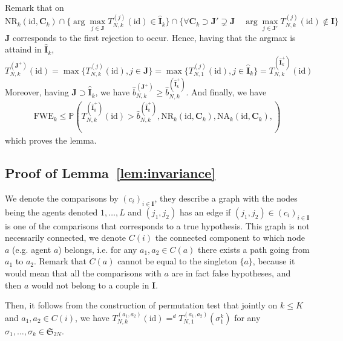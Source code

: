 \documentclass{article}
\theoremstyle{plain}
\theoremstyle{remark}
\renewcommand{\P}{\mathbb{P}}
\renewcommand{\S}{\mathfrak{S}}
\newcommand{\1}{\mathbbm{1}}
\newcommand{\id}{\mathrm{id}}
\numberwithin{equation}{section}
\begin{document}
Remark that on $$\mathrm{NR}_k(\id,\textbf{C}_k) \cap \{\arg\max_{j \in \textbf{J}}T_{N,k}^{(j)}(\id) \in \widehat{\textbf{I}}_k\}\cap\{ \forall \textbf{C}_k \supset \textbf{J}'\supsetneq\textbf{J} \quad  \arg\max_{j \in \textbf{J}'}T_{N,k}^{(j)}(\id) \notin \textbf{I}\}  $$
$\textbf{J}$ corresponds to the first rejection to occur. Hence, having that the argmax is attaind in $\widehat{\textbf{I}}_k$,
$$T_{N,k}^{(\textbf{J}^+)}(\id)= \max\{T_{N,k}^{(j)}(\id), j \in \textbf{J}\} = \max\{T_{N,1}^{(j)}(\id), j \in \widehat{\textbf{I}}_k\} = T_{N,k}^{(\widehat{\textbf{I}}_k^+)}(\id)$$
Moreover, having $\textbf{J} \supset \widehat{\textbf{I}}_k$, we have $\widehat{b}_{N,k}^{(\textbf{J}^+)} \ge \widehat{b}_{N,k}^{(\widehat{\textbf{I}}_k^+)}$. And finally, we have 
\begin{align*}
\mathrm{FWE}_k\le \P\left( T_{N,k}^{(\widehat{\textbf{I}}_k^+)}(\id) > \widehat{b}_{N,k}^{(\widehat{\textbf{I}}_k^+)}, \mathrm{NR}_k(\id,\textbf{C}_k),\mathrm{NA}_k(\id, \textbf{C}_k), \right)
\end{align*}
which proves the lemma.
\subsection{Proof of Lemma~\ref{lem:invariance}}
We denote the comparisons by $(c_i)_{i \in \textbf{I}}$, they describe a graph with the nodes being the agents denoted $1,\dots,L$ and $(j_1,j_2)$ has an edge if $(j_1,j_2)\in(c_i)_{i \in \textbf{I}}$ is one of the comparisons that corresponds to a true hypothesis. This graph is not necessarily connected, we denote $C(i)$ the connected component to which node $a$ (e.g. agent $a$) belongs, i.e. for any $a_1,a_2 \in C(a)$ there exists a path going from $a_1$ to $a_2$. Remark that $C(a)$ cannot be equal to the singleton $\{a\}$, because it would mean that all the comparisons with $a$ are in fact false hypotheses, and then $a$ would not belong to a couple in $\textbf{I}$.

Then, it follows from the construction of permutation test that jointly on $k\le K$ and $a_1,a_2 \in C(i)$, we have $T_{N,k}^{(a_1,a_2)}(\id)=^d T_{N,1}^{(a_1,a_2)}(\sigma_1^k)$ for any $\sigma_1,\dots,\sigma_k \in  \S_{2N}$.
\end{document}

